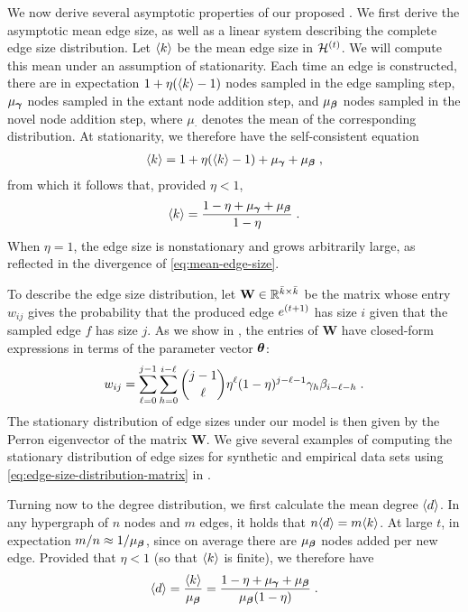 We now derive several asymptotic properties of our proposed \model. 
We first derive the asymptotic mean edge size, as well as a linear system describing the complete edge size distribution.  
Let $\langle k \rangle$ be the mean edge size in $\mathcal{H}^{(t)}$.
We will compute this mean under an assumption of stationarity.
Each time an edge is constructed, there are in expectation $1 + \eta(\langle k \rangle-1)$ nodes sampled in the edge sampling step, $\mu_{\boldsymbol{\gamma}}$ nodes sampled in the extant node addition step, and $\mu_{\boldsymbol{\beta}}$ nodes sampled in the novel node addition step, where $\mu_{\cdot}$ denotes the mean of the corresponding distribution. 
At stationarity, we therefore have the self-consistent equation 
\begin{align}
    \langle k \rangle = 1 + \eta(\langle k \rangle-1) + \mu_{\boldsymbol{\gamma}} + \mu_{\boldsymbol{\beta}}\;, \label{eq:mean-edge-size-eq}
\end{align}
from which it follows that, provided $\eta < 1$, 
\begin{align}
    \langle k \rangle = \frac{1 - \eta + \mu_{\boldsymbol{\gamma}} + \mu_{\boldsymbol{\beta}}}{1-\eta}\;. \label{eq:mean-edge-size}
\end{align}
When $\eta = 1$, the edge size is nonstationary and grows arbitrarily large, as reflected in the divergence of \cref{eq:mean-edge-size}. 

To describe the edge size distribution, let $\mathbf{W} \in \mathbb{R}^{\bar{k}\times \bar{k}}$ be the matrix whose entry $w_{ij}$ gives the probability that the produced edge $e^{(t+1)}$ has size $i$ given that the sampled edge $f$ has size $j$. 
As we show in , the entries of $\mathbf{W}$ have closed-form expressions in terms of the parameter vector $\boldsymbol{\theta}$: 
\begin{align}
    w_{ij} = \sum_{\ell = 0}^{j-1} \sum_{h = 0}^{i - \ell} \binom{j-1}{\ell} \eta^{\ell} (1-\eta)^{j - \ell - 1} \gamma_h \beta_{i - \ell - h}\;. \label{eq:edge-size-distribution-matrix}
\end{align}
The stationary distribution of edge sizes under our model is then given by the Perron eigenvector of the matrix $\mathbf{W}$. 
We give several examples of computing the stationary distribution of edge sizes for synthetic and empirical data sets using \cref{eq:edge-size-distribution-matrix} in . 


Turning now to the degree distribution, we first calculate the mean degree $\langle d \rangle$. 
In any hypergraph of $n$ nodes and $m$ edges, it holds that  ${n}\langle d \rangle = {m \langle k \rangle}$. 
At large $t$, in expectation $m/n \approx {1}/{\mu_{\boldsymbol{\beta}}}$, since on average there are $\mu_{\boldsymbol{\beta}}$ nodes added per new edge. 
Provided that $\eta <1$ (so that $\langle k \rangle$ is finite), we therefore have 
\begin{align}
    \langle d \rangle = \frac{\langle k \rangle}{\mu_{\boldsymbol{\beta}}} = \frac{1 - \eta + \mu_{\boldsymbol{\gamma}} + \mu_{\boldsymbol{\beta}}}{\mu_{\boldsymbol{\beta}}(1-\eta)}\;. \label{eq:mean-degree}
\end{align}

